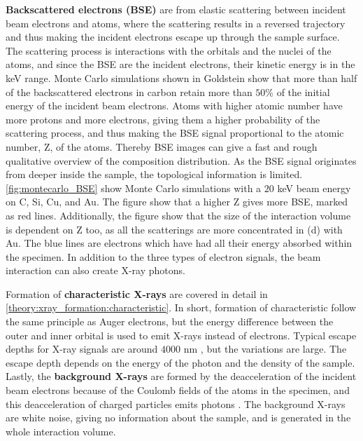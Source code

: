 \textbf{Backscattered electrons (BSE)} are from elastic scattering between incident beam electrons and atoms, where the scattering results in a reversed trajectory and thus making the incident electrons escape up through the sample surface.
The scattering process is interactions with the orbitals and the nuclei of the atoms, and since the BSE are the incident electrons, their kinetic energy is in the keV range.
Monte Carlo simulations shown in Goldstein \cite[Fig. 2.16 b]{goldstein_scanning_2018} show that more than half of the backscattered electrons in carbon retain more than $50$\% of the initial energy of the incident beam electrons.
Atoms with higher atomic number have more protons and more electrons, giving them a higher probability of the scattering process, and thus making the BSE signal proportional to the atomic number, Z, of the atoms.
Thereby BSE images can give a fast and rough qualitative overview of the composition distribution.
As the BSE signal originates from deeper inside the sample, the topological information is limited.
\cref{fig:montecarlo_BSE} show Monte Carlo simulations with a $20$ keV beam energy on C, Si, Cu, and Au.
The figure show that a higher Z gives more BSE, marked as red lines.
Additionally, the figure show that the size of the interaction volume is dependent on Z too, as all the scatterings are more concentrated in (d) with Au.
The blue lines are electrons which have had all their energy absorbed within the specimen.
In addition to the three types of electron signals, the beam interaction can also create X-ray photons.




Formation of \textbf{characteristic X-rays} are covered in detail in \cref{theory:xray_formation:characteristic}.
In short, formation of characteristic follow the same principle as Auger electrons, but the energy difference between the outer and inner orbital is used to emit X-rays instead of electrons.
Typical escape depths for X-ray signals are around $4000$ nm \cite{hollas_modern_2004}, but the variations are large.
The escape depth depends on the energy of the photon and the density of the sample.
Lastly, the \textbf{background X-rays} are formed by the deacceleration of the incident beam electrons because of the Coulomb fields of the atoms in the specimen, and this deacceleration of charged particles emits photons \cite{notaros_electromagnetics_2010}.
The background X-rays are white noise, giving no information about the sample, and is generated in the whole interaction volume.



